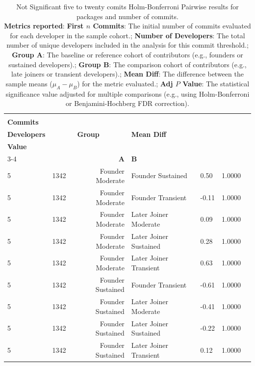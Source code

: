 \begin{table}[H]
\centering
\setlength{\tabcolsep}{2pt}
\caption[Not Significant Holm-Bonferroni Pairwise five and ten commits results packages]{Not Significant five to twenty comits Holm-Bonferroni Pairwise results for packages and number of commits. \\ \textbf{Metrics reported}:   \textbf{First $n$ Commits}: The initial number of commits evaluated for each developer in the sample cohort.;  \textbf{Number of Developers}: The total number of unique developers included in the analysis for this commit threshold.;  \textbf{Group A}: The baseline or reference cohort of contributors (e.g., founders or sustained developers).;  \textbf{Group B}: The comparison cohort of contributors (e.g., late joiners or transient developers).;  \textbf{Mean Diff}: The difference between the sample means ($\mu_A - \mu_B$) for the metric evaluated.;  \textbf{Adj $P$ Value}: The statistical significance value adjusted for multiple comparisons (e.g., using Holm-Bonferroni or Benjamini-Hochberg FDR correction).
}
\begin{tabular}{l r r l l r r}
\toprule
\makecell[t]{\textbf{First $n$}\\\textbf{Commits}} & \makecell[t]{\textbf{Number of}\\\textbf{Developers}} & \multicolumn{2}{c}{\textbf{Group}} & \textbf{Mean Diff} & \makecell[t]{\textbf{Adj $P$}\\\textbf{Value}} \\ 
\cmidrule(lr){3-4}
 &  & \textbf{A} & \textbf{B} &  &  \\ 
\midrule
5 & 1342 & Founder Moderate & Founder Sustained & 0.50 & 1.0000 \\ 
5 & 1342 & Founder Moderate & Founder Transient & -0.11 & 1.0000 \\ 
5 & 1342 & Founder Moderate & Later Joiner Moderate & 0.09 & 1.0000 \\ 
5 & 1342 & Founder Moderate & Later Joiner Sustained & 0.28 & 1.0000 \\ 
5 & 1342 & Founder Moderate & Later Joiner Transient & 0.63 & 1.0000 \\ 
5 & 1342 & Founder Sustained & Founder Transient & -0.61 & 1.0000 \\ 
5 & 1342 & Founder Sustained & Later Joiner Moderate & -0.41 & 1.0000 \\ 
5 & 1342 & Founder Sustained & Later Joiner Sustained & -0.22 & 1.0000 \\ 
5 & 1342 & Founder Sustained & Later Joiner Transient & 0.12 & 1.0000 \\ 

\end{tabular}
\end{table}
